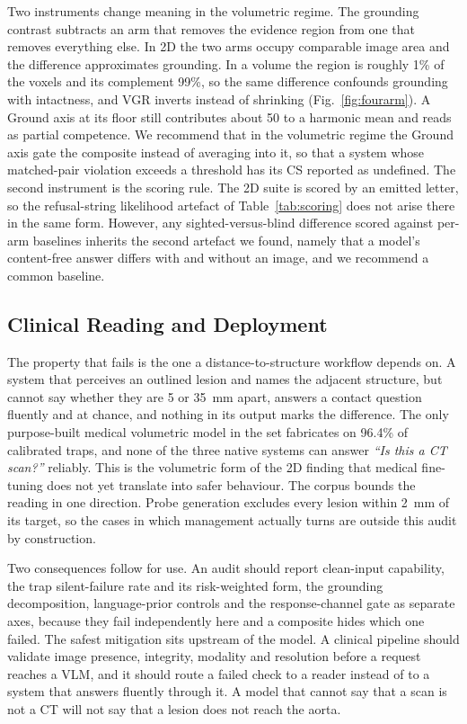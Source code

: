 Two instruments change meaning in the volumetric regime. The grounding
contrast subtracts an arm that removes the evidence region from one that
removes everything else. In 2D the two arms occupy comparable image area and
the difference approximates grounding. In a volume the region is roughly
1\% of the voxels and its complement 99\%, so the same difference confounds
grounding with intactness, and VGR inverts instead of shrinking
(Fig.~\ref{fig:fourarm}). A Ground axis at its floor still contributes
about 50 to a harmonic mean and reads as partial competence. We recommend
that in the volumetric regime the Ground axis gate the composite instead of
averaging into it, so that a system whose matched-pair violation exceeds a
threshold has its CS reported as undefined. The second instrument is the
scoring rule. The 2D suite is scored by an emitted letter, so the
refusal-string likelihood artefact of Table~\ref{tab:scoring} does not arise
there in the same form. However, any sighted-versus-blind difference scored
against per-arm baselines inherits the second artefact we found, namely
that a model's content-free answer differs with and without an image, and
we recommend a common baseline.

\subsection{Clinical Reading and Deployment}

The property that fails is the one a distance-to-structure workflow depends
on. A system that perceives an outlined lesion and names the adjacent
structure, but cannot say whether they are 5 or 35~mm apart, answers a
contact question fluently and at chance, and nothing in its output marks the
difference. The only purpose-built medical volumetric model in the set
fabricates on 96.4\% of calibrated traps, and none of the three native
systems can answer \emph{``Is this a CT scan?''} reliably. This is the
volumetric form of the 2D finding that medical fine-tuning does not yet
translate into safer behaviour. The corpus bounds the reading in one
direction. Probe generation excludes every lesion within 2~mm of its target,
so the cases in which management actually turns are outside this audit by
construction.

Two consequences follow for use. An audit should report clean-input
capability, the trap silent-failure rate and its risk-weighted form, the
grounding decomposition, language-prior controls and the response-channel
gate as separate axes, because they fail independently here and a composite
hides which one failed. The safest mitigation sits upstream of the model. A
clinical pipeline should validate image presence, integrity, modality and
resolution before a request reaches a VLM, and it should route a failed
check to a reader instead of to a system that answers fluently through it.
A model that cannot say that a scan is not a CT will not say that a lesion
does not reach the aorta.

